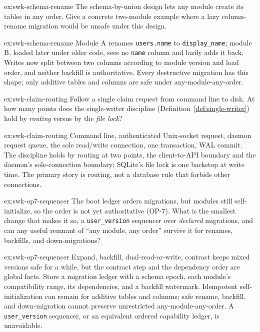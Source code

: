 \documentclass[11pt,a4paper]{article}
\theoremstyle{definition}
\theoremstyle{remark}
\begin{document}

\begin{pdexercise}[kind=Check,rating=1]{ex:swk-schema-rename}
The schema-by-union design lets any module create its tables in any order. Give a concrete two-module example where a lazy column-rename migration would be unsafe under this design.
\end{pdexercise}
\begin{pdsolution}{ex:swk-schema-rename}
Module A renames \texttt{users.name} to \texttt{display\_name}; module B, loaded later under older code, sees no \texttt{name} column and lazily adds it back. Writes now split between two columns according to module version and load order, and neither backfill is authoritative. Every destructive migration has this shape; only additive tables and columns are safe under any-module-any-order.
\end{pdsolution}
\begin{pdexercise}[kind=Trace,rating=2]{ex:swk-claim-routing}
Follow a single claim request from command line to disk. At how many points does the single-writer discipline (Definition~\ref{def:single-writer}) hold by \emph{routing} versus by the \emph{file lock}?
\end{pdexercise}
\begin{pdsolution}{ex:swk-claim-routing}
Command line, authenticated Unix-socket request, daemon request queue, the sole read/write connection, one transaction, WAL commit. The discipline holds by routing at two points, the client-to-API boundary and the daemon's sole-connection boundary; SQLite's file lock is one backstop at write time. The primary story is routing, not a database rule that forbids other connections.
\end{pdsolution}
\begin{pdexercise}[kind=Open,rating=3]{ex:swk-op7-sequencer}
The boot ledger orders migrations, but modules still self-initialize, so the order is not yet authoritative (OP-7). What is the smallest change that makes it so, a \texttt{user\_version} sequencer over \emph{declared} migrations, and can any useful remnant of ``any module, any order'' survive it for renames, backfills, and down-migrations?
\end{pdexercise}
\begin{pdsolution}{ex:swk-op7-sequencer}
Expand, backfill, dual-read-or-write, contract keeps mixed versions safe for a while, but the contract step and the dependency order are global facts. Store a migration ledger with a schema epoch, each module's compatibility range, its dependencies, and a backfill watermark. Idempotent self-initialization can remain for additive tables and columns; safe rename, backfill, and down-migration cannot preserve unrestricted any-module-any-order. A \texttt{user\_version} sequencer, or an equivalent ordered capability ledger, is unavoidable.
\end{pdsolution}
\end{document}
